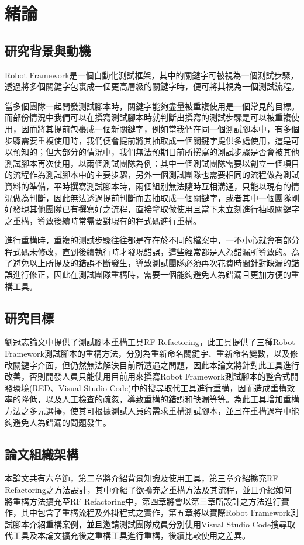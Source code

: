 \chapter{緒論}
\section{研究背景與動機}
\indent
Robot Framework\cite{robotframework}是一個自動化測試框架，其中的關鍵字可被視為一個測試步驟，透過將多個關鍵字包裹成一個更高層級的關鍵字時，便可將其視為一個測試流程。

\indent
當多個團隊一起開發測試腳本時，關鍵字能夠盡量被重複使用是一個常見的目標。而部份情況中我們可以在撰寫測試腳本時就判斷出撰寫的測試步驟是可以被重複使用，因而將其提前包裹成一個新關鍵字，例如當我們在同一個測試腳本中，有多個步驟需要重複使用時，我們便會提前將其抽取成一個關鍵字提供多處使用，這是可以預知的；但大部分的情況中，我們無法預期目前所撰寫的測試步驟是否會被其他測試腳本再次使用，以兩個測試團隊為例：其中一個測試團隊需要以創立一個項目的流程作為測試腳本中的主要步驟，另外一個測試團隊也需要相同的流程做為測試資料的準備，平時撰寫測試腳本時，兩個組別無法隨時互相溝通，只能以現有的情況做為判斷，因此無法透過提前判斷而去抽取成一個關鍵字，或者其中一個團隊剛好發現其他團隊已有撰寫好之流程，直接拿取做使用且當下未立刻進行抽取關鍵字之重構，導致後續時常需要對現有的程式碼進行重構。

\indent
進行重構時，重複的測試步驟往往都是存在於不同的檔案中，一不小心就會有部分程式碼未修改，直到後續執行時才發現錯誤，這些經常都是人為錯漏所導致的。為了避免以上所提及的錯誤不斷發生，導致測試團隊必須再次花費時間針對缺漏的錯誤進行修正，因此在測試團隊重構時，需要一個能夠避免人為錯漏且更加方便的重構工具。

\section{研究目標}
\indent
劉冠志論文\cite{LIU-Thesis}中提供了測試腳本重構工具RF Refactoring，此工具提供了三種Robot Framework測試腳本的重構方法，分別為重新命名關鍵字、重新命名變數，以及修改關鍵字介面，但仍然無法解決目前所遭遇之問題，因此本論文將針對此工具進行改善，否則開發人員只能使用目前用來撰寫Robot Framework測試腳本的整合式開發環境(RED\cite{RED}、Visual Studio Code\cite{VSCode})中的搜尋取代工具進行重構，因而造成重構效率的降低，以及人工檢查的疏忽，導致重構的錯誤和缺漏等等。為此工具增加重構方法之多元選擇，使其可根據測試人員的需求重構測試腳本，並且在重構過程中能夠避免人為錯漏的問題發生。

\section{論文組織架構}
\indent
本論文共有六章節，第二章將介紹背景知識及使用工具，第三章介紹擴充RF Refactoring之方法設計，其中介紹了欲擴充之重構方法及其流程，並且介紹如何將重構方法擴充至RF Refactoring中，第四章將會以第三章所設計之方法進行實作，其中包含了重構流程及外掛程式之實作，第五章將以實際Robot Framework測試腳本介紹重構案例，並且邀請測試團隊成員分別使用Visual Studio Code搜尋取代工具及本論文擴充後之重構工具進行重構，後續比較使用之差異。